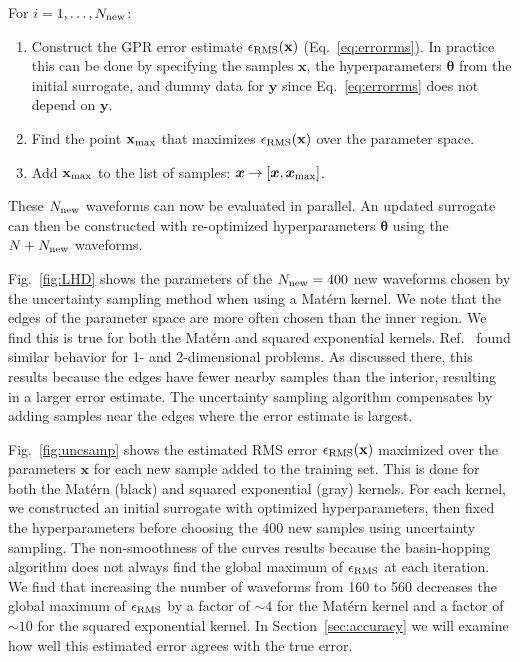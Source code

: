 \documentclass[prd,aps,letter,twocolumn,floatfix,notitlepage,nofootinbib]{revtex4-1}
\def\bx{\mathbf{x}}
\def\by{\mathbf{y}}
\def\btheta{\boldsymbol{\theta}}
\begin{document}
For $i = 1, \dots, N_{\rm new}$:
\begin{enumerate}

\item Construct the GPR error estimate $\epsilon_{\rm RMS}(\bx)$ (Eq.~\eqref{eq:errorrms}). In practice this can be done by specifying the samples $\bx$, the hyperparameters $\btheta$ from the initial surrogate, and dummy data for $\by$ since Eq.~\eqref{eq:errorrms} does not depend on $\by$.

\item Find the point $\bx_{\rm max}$ that maximizes $\epsilon_{\rm RMS}(\bx)$ over the parameter space. 

\item Add $\bx_{\rm max}$ to the list of samples: ${\bm x} \to [{\bm x}, {\bm x}_{\rm max}]$.

\end{enumerate}
These $N_{\rm new}$ waveforms can now be evaluated in parallel. An updated surrogate can then be constructed with re-optimized hyperparameters $\btheta$ using the $N + N_{\rm new}$ waveforms.

Fig.~\ref{fig:LHD} shows the parameters of the $N_{\rm new}=400$ new waveforms chosen by the uncertainty sampling method when using a Mat\'{e}rn kernel. We note that the edges of the parameter space are more often chosen than the inner region. We find this is true for both the Mat\'{e}rn and squared exponential kernels. Ref.~\cite{DoctorFarrHolz2017} found similar behavior for 1- and 2-dimensional problems. As discussed there, this results because the edges have fewer nearby samples than the interior, resulting in a larger error estimate. The uncertainty sampling algorithm compensates by adding samples near the edges where the error estimate is largest.

Fig.~\ref{fig:uncsamp} shows the estimated RMS error $\epsilon_{\rm RMS}(\bx)$ maximized over the parameters $\bx$ for each new sample added to the training set. This is done for both the Mat\'{e}rn (black) and squared exponential (gray) kernels. For each kernel, we constructed an initial surrogate with optimized hyperparameters, then fixed the hyperparameters before choosing the 400 new samples using uncertainty sampling. The non-smoothness of the curves results because the basin-hopping algorithm does not always find the global maximum of $\epsilon_{\rm RMS}$ at each iteration. We find that increasing the number of waveforms from 160 to 560 decreases the global maximum of $\epsilon_{\rm RMS}$ by a factor of $\sim 4$ for the Mat\'{e}rn kernel and a factor of $\sim 10$ for the squared exponential kernel. In Section~\ref{sec:accuracy} we will examine how well this estimated error agrees with the true error.
\end{document}
